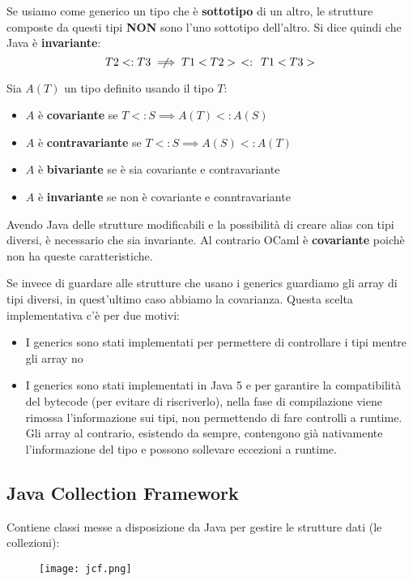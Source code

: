 \noindent Se usiamo come generico un tipo che è \textbf{sottotipo} di un altro, le strutture composte da questi tipi \textbf{NON} sono l'uno sottotipo dell'altro. Si dice quindi che Java è \textbf{invariante}:
\begin{equation*}
	T2 <: T3 \centernot\implies T1<T2> \:\: <: \:\: T1<T3>
\end{equation*}
\begin{note}
	Sia $A(T)$ un tipo definito usando il tipo $T$:
	\begin{itemize}
		\item $A$ è \textbf{covariante} se $T<:S \implies A(T) <: A(S)$
		\item $A$ è \textbf{contravariante} se $T<:S \implies A(S) <: A(T)$
		\item $A$ è \textbf{bivariante} se è sia covariante e contravariante
		\item $A$ è \textbf{invariante} se non è covariante e conntravariante
	\end{itemize}
\end{note}
Avendo Java delle strutture modificabili e la possibilità di creare alias con tipi diversi, è necessario che sia invariante. Al contrario OCaml è \textbf{covariante} poichè non ha queste caratteristiche.
\begin{note}
	Se invece di guardare alle strutture che usano i generics guardiamo gli array di tipi diversi, in quest'ultimo caso abbiamo la covarianza. Questa scelta implementativa c'è per due motivi:
	\begin{itemize}
		\item I generics sono stati implementati per permettere di controllare i tipi mentre gli array no
		\item I generics sono stati implementati in Java 5 e per garantire la compatibilità del bytecode (per evitare di riscriverlo), nella fase di compilazione viene rimossa l'informazione sui tipi, non permettendo di fare controlli a runtime. Gli array al contrario, esistendo da sempre, contengono già nativamente l'informazione del tipo e possono sollevare eccezioni a runtime.
	\end{itemize}
\end{note}
\subsection{Java Collection Framework}
Contiene classi messe a disposizione da Java per gestire le strutture dati (le collezioni):
\begin{figure}
	\texttt{[image: jcf.png]}
\end{figure}
